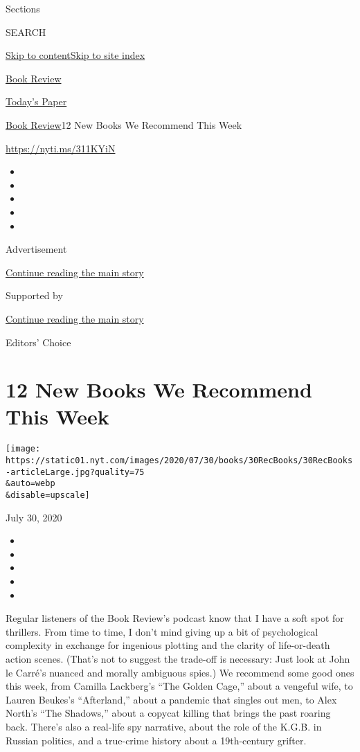 Sections

SEARCH

\protect\hyperlink{site-content}{Skip to
content}\protect\hyperlink{site-index}{Skip to site index}

\href{https://www.nytimes.com/section/books/review}{Book Review}

\href{https://myaccount.nytimes.com/auth/login?response_type=cookie\&client_id=vi}{}

\href{https://www.nytimes.com/section/todayspaper}{Today's Paper}

\href{/section/books/review}{Book Review}\textbar{}12 New Books We
Recommend This Week

\url{https://nyti.ms/311KYiN}

\begin{itemize}
\item
\item
\item
\item
\item
\end{itemize}

Advertisement

\protect\hyperlink{after-top}{Continue reading the main story}

Supported by

\protect\hyperlink{after-sponsor}{Continue reading the main story}

Editors' Choice

\hypertarget{12-new-books-we-recommend-this-week}{%
\section{12 New Books We Recommend This
Week}\label{12-new-books-we-recommend-this-week}}

\texttt{[image: https://static01.nyt.com/images/2020/07/30/books/30RecBooks/30RecBooks-articleLarge.jpg?quality=75\\\&auto=webp\\\&disable=upscale]}

July 30, 2020

\begin{itemize}
\item
\item
\item
\item
\item
\end{itemize}

Regular listeners of the Book Review's podcast know that I have a soft
spot for thrillers. From time to time, I don't mind giving up a bit of
psychological complexity in exchange for ingenious plotting and the
clarity of life-or-death action scenes. (That's not to suggest the
trade-off is necessary: Just look at John le Carré's nuanced and morally
ambiguous spies.) We recommend some good ones this week, from Camilla
Lackberg's ``The Golden Cage,'' about a vengeful wife, to Lauren
Beukes's ``Afterland,'' about a pandemic that singles out men, to Alex
North's ``The Shadows,'' about a copycat killing that brings the past
roaring back. There's also a real-life spy narrative, about the role of
the K.G.B. in Russian politics, and a true-crime history about a
19th-century grifter.

